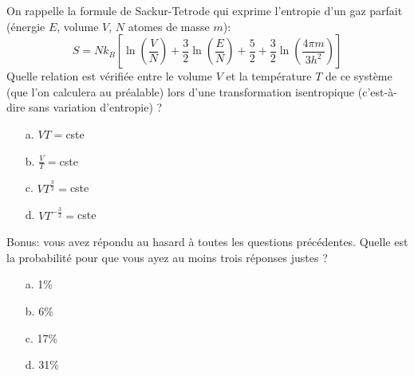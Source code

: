 \documentclass[utf8, 11pt]{feuille}
\begin{document}
\question
On rappelle la formule de Sackur-Tetrode qui exprime l'entropie d'un gaz parfait (énergie $E$, volume $V$, $N$ atomes de masse $m$):
$$
S=N k_B\left[ \ln (\frac{V}{N})+\frac{3}{2} \ln( \frac{E}{N})+\frac{5}{2}+\frac{3}{2} \ln(\frac{4\pi m}{3 h^2})\right]
$$
Quelle relation est vérifiée entre le volume $V$ et la température $T$ de ce système (que l'on calculera au préalable) lors d'une transformation isentropique (c'est-à-dire sans variation d'entropie) ?
\begin{itemize}
\item[a.] $VT=$cste
\item[b.] $\frac{V}{T}=$cste
\item[c.] $VT^{\frac{3}{2}}=$cste
\item[d.] $VT^{-\frac{3}{2}}=$cste
\end{itemize}

\question
Bonus: vous avez répondu au hasard à toutes les questions précédentes. Quelle est la probabilité pour que vous ayez au moins trois réponses justes ?
\begin{itemize}
\item[a.] 1\%
\item[b.] 6\%
\item[c.] 17\%
\item[d.] 31\%
\end{itemize}
\end{document}
